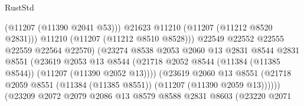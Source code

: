 \begin{lexlean}{RustStd}
\begin{coremodule}
                                                (@11207 (@11390 @2041 @53)))
                                              @21623
                                              @11210
                                              (@11207 (@11212 @8520 @2831)))
                                            @11210
                                            (@11207 (@11212 @8510 @8528)))
                                          @22549
                                          @22552
                                          @22555
                                          @22559
                                          @22564
                                          @22570)
                                        (@23274
                                          @8538
                                          @2053
                                          @2060
                                          @13
                                          @2831
                                          @8544
                                          @2831
                                          @8551
                                          (@23619
                                            @2053
                                            @13
                                            @8544
                                            (@21718
                                              @2052
                                              @8544
                                              (@11384 (@11385 @8544))
                                              (@11207 (@11390 @2052 @13))))
                                          (@23619
                                            @2060
                                            @13
                                            @8551
                                            (@21718
                                              @2059
                                              @8551
                                              (@11384 (@11385 @8551))
                                              (@11207 (@11390 @2059 @13))))))
                                      (@23209
                                        @2072
                                        @2079
                                        @2086
                                        @13
                                        @8579
                                        @8588
                                        @2831
                                        @8603
                                        (@23220
                                          @2071

\end{coremodule}
\end{lexlean}

